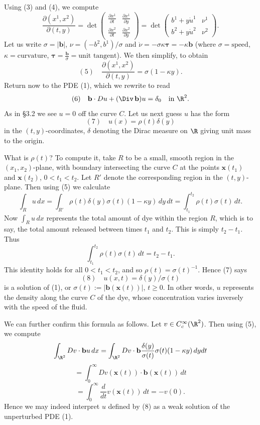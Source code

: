 \begin{example}
Using (3) and (4), we compute
$$\frac{\partial(x^1, x^2)}{\partial(t,y)} = \det\begin{pmatrix} \frac{\partial x^1}{\partial t} & \frac{\partial x^1}{\partial y} \\ \frac{\partial x^2}{\partial t} & \frac{\partial x^2}{\partial y} \end{pmatrix} = \det\begin{pmatrix} b^1 + y\dot{u}^1 & \nu^1 \\ b^2 + y\dot{u}^2 & \nu^2 \end{pmatrix}.$$
Let us write $\sigma = |\mathbf{b}|$, $\nu = (-b^2, b^1)/\sigma$ and $\dot{\nu} = -\sigma\kappa\boldsymbol{\tau} = -\kappa\mathbf{b}$ (where $\sigma = \text{speed}$, $\kappa = \text{curvature}$, $\boldsymbol{\tau} = \frac{\mathbf{b}}{\sigma} = \text{unit tangent}$). We then simplify, to obtain
$$(5) \quad \frac{\partial(x^1, x^2)}{\partial(t,y)} = \sigma(1 - \kappa y).$$
Return now to the PDE (1), which we rewrite to read
$$(6) \quad \mathbf{b} \cdot Du + (\Div\,\mathbf{b})u = \delta_0 \quad \text{in } \R^2.$$
As in \S3.2 we see $u = 0$ off the curve $C$. Let us next guess $u$ has the form
$$(7) \quad u(x) = \rho(t)\delta(y)$$
in the $(t,y)$-coordinates, $\delta$ denoting the Dirac measure on $\R$ giving unit mass to the origin.

What is $\rho(t)$? To compute it, take $R$ to be a small, smooth region in the $(x_1, x_2)$-plane, with boundary intersecting the curve $C$ at the points $\mathbf{x}(t_1)$ and $\mathbf{x}(t_2)$, $0 < t_1 < t_2$. Let $R'$ denote the corresponding region in the $(t,y)$-plane. Then using (5) we calculate
$$\int_R u\, dx = \int_{R'} \rho(t)\delta(y)\sigma(t)(1 - \kappa y)\, dy\, dt = \int_{t_1}^{t_2} \rho(t)\sigma(t)\, dt.$$
Now $\int_R u\, dx$ represents the total amount of dye within the region $R$, which is to say, the total amount released between times $t_1$ and $t_2$. This is simply $t_2 - t_1$. Thus
$$\int_{t_1}^{t_2} \rho(t)\sigma(t)\, dt = t_2 - t_1.$$
This identity holds for all $0 < t_1 < t_2$, and so $\rho(t) = \sigma(t)^{-1}$. Hence (7) says
$$(8) \quad u(x,t) = \delta(y)/\sigma(t)$$
is a solution of (1), or $\sigma(t) := |\mathbf{b}(\mathbf{x}(t))|$, $t \geq 0$. In other words, $u$ represents the density along the curve $C$ of the dye, whose concentration varies inversely with the speed of the fluid.

We can further confirm this formula as follows. Let $v \in C_c^\infty(\R^2)$. Then using (5), we compute
$$\int_{\R^2} Dv \cdot \mathbf{b}u \, dx = \int_{\R^2} Dv \cdot \mathbf{b} \frac{\delta(y)}{\sigma(t)} \sigma(t)(1 - \kappa y) \, dy dt$$
$$= \int_0^\infty Dv(\mathbf{x}(t)) \cdot \mathbf{b}(\mathbf{x}(t)) \, dt$$
$$= \int_0^\infty \frac{d}{dt} v(\mathbf{x}(t)) \, dt = -v(0).$$
Hence we may indeed interpret $u$ defined by (8) as a weak solution of the unperturbed PDE (1).


\end{example}

